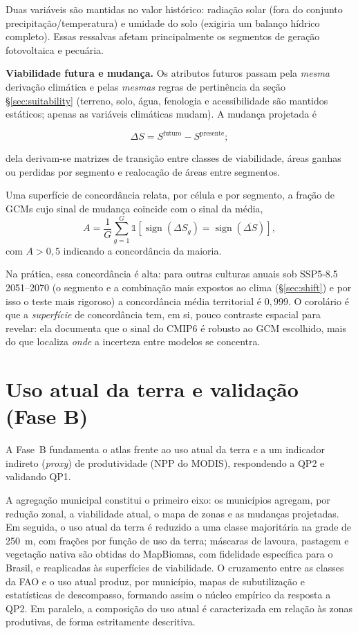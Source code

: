 Duas variáveis são mantidas no valor histórico: radiação solar (fora do conjunto
precipitação/temperatura) e umidade do solo (exigiria um balanço hídrico completo). Essas ressalvas
afetam principalmente os segmentos de geração fotovoltaica e pecuária.

\textbf{Viabilidade futura e mudança.} Os atributos futuros passam pela \emph{mesma} derivação
climática e pelas \emph{mesmas} regras de pertinência da seção \S\ref{sec:suitability} (terreno, solo, água, fenologia e
acessibilidade são mantidos estáticos; apenas as variáveis climáticas mudam). A mudança projetada é

\begin{equation*}
  \Delta S = S^{\text{futuro}} - S^{\text{presente}};
\end{equation*}

dela derivam-se matrizes de transição entre classes de viabilidade, áreas ganhas ou perdidas por
segmento e realocação de áreas entre segmentos.

Uma superfície de concordância relata, por célula e por segmento, a
fração de GCMs cujo sinal de mudança coincide com o sinal da média,
\begin{equation*}
  A = \frac{1}{G}\sum_{g=1}^{G}
   \mathbb{1}\!\left[\operatorname{sign}(\Delta S_g) = \operatorname{sign}(\overline{\Delta S})\right],
\end{equation*}
com $A > 0{,}5$ indicando a concordância da maioria.

Na prática, essa concordância é alta: para outras culturas anuais sob SSP5-8.5 2051--2070 (o
segmento e a combinação mais expostos ao clima (\S\ref{sec:shift}) e por isso o teste mais
rigoroso) a concordância média territorial é $0{,}999$. O corolário é que a
\emph{superfície} de concordância tem, em si, pouco contraste espacial para revelar: ela
documenta que o sinal do CMIP6 é robusto ao GCM escolhido, mais do que localiza \emph{onde} a
incerteza entre modelos se concentra.

\section{Uso atual da terra e validação (Fase B)}\label{sec:phaseb}

A Fase~B fundamenta o atlas frente ao uso atual da terra e a um indicador indireto (\emph{proxy}) de
produtividade (NPP do MODIS), respondendo a QP2 e validando QP1.

A agregação municipal constitui o primeiro eixo: os municípios agregam, por redução zonal, a
viabilidade atual, o mapa de zonas e as mudanças projetadas. Em seguida, o uso atual da terra é
reduzido a uma classe majoritária na grade de 250~m, com frações por função de uso da terra;
máscaras de lavoura, pastagem e vegetação nativa são obtidas do MapBiomas, com fidelidade
específica para o Brasil, e reaplicadas às superfícies de viabilidade. O cruzamento entre as classes
da FAO e o uso atual produz, por município, mapas de subutilização e estatísticas de descompasso, formando assim
o núcleo empírico da resposta a QP2. Em paralelo, a composição do uso atual é caracterizada em
relação às zonas produtivas, de forma estritamente descritiva.

